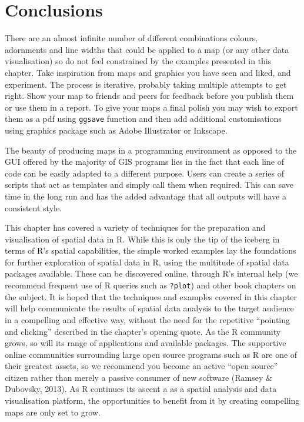 \documentclass[]{article}
\begin{document}
\section{Conclusions}\label{conclusions}

There are an almost infinite number of different combinations colours,
adornments and line widths that could be applied to a map (or any other
data visualisation) so do not feel constrained by the examples presented
in this chapter. Take inspiration from maps and graphics you have seen
and liked, and experiment. The process is iterative, probably taking
multiple attempts to get right. Show your map to friends and peers for
feedback before you publish them or use them in a report. To give your
maps a final polish you may wish to export them as a pdf using
\texttt{ggsave} function and then add additional customisations using
graphics package such as Adobe Illustrator or Inkscape.

The beauty of producing maps in a programming environment as opposed to
the GUI offered by the majority of GIS programs lies in the fact that
each line of code can be easily adapted to a different purpose. Users
can create a series of scripts that act as templates and simply call
them when required. This can save time in the long run and has the added
advantage that all outputs will have a consistent style.

This chapter has covered a variety of techniques for the preparation and
visualisation of spatial data in R. While this is only the tip of the
iceberg in terms of R's spatial capabilities, the simple worked examples
lay the foundations for further exploration of spatial data in R, using
the multitude of spatial data packages available. These can be
discovered online, through R's internal help (we recommend frequent use
of R queries such as \texttt{?plot}) and other book chapters on the
subject. It is hoped that the techniques and examples covered in this
chapter will help communicate the results of spatial data analysis to
the target audience in a compelling and effective way, without the need
for the repetitive ``pointing and clicking'' described in the chapter's
opening quote. As the R community grows, so will its range of
applications and available packages. The supportive online communities
surrounding large open source programs such as R are one of their
greatest assets, so we recommend you become an active ``open source''
citizen rather than merely a passive consumer of new software (Ramsey \&
Dubovsky, 2013). As R continues its ascent a as a spatial analysis and
data visualisation platform, the opportunities to benefit from it by
creating compelling maps are only set to grow.
\end{document}
